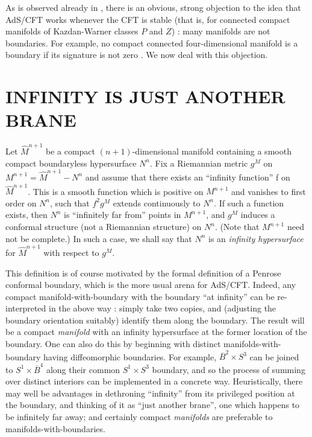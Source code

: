 \documentclass[a4paper,12pt]{article}
\theoremstyle{definition}
\renewcommand{\u}{\textit}
\renewcommand{\-}{$\dfrac{\quad\enspace}{\quad}$}
\begin{document}
As is observed already in \cite{3}, there is an obvious, strong objection to the idea that AdS/CFT works whenever the CFT is stable (that is, for connected compact manifolds of Kazdan-Warner classes $P$ and $Z$) : many manifolds are not boundaries. For example, no compact connected four-dimensional manifold is a boundary if its signature is not zero \cite{17}. We now deal with this objection.

\section{\large INFINITY IS JUST ANOTHER BRANE}

Let $\hat{M}^{n+1}$ be a compact $(n+1)$-dimensional manifold containing a smooth compact boundaryless hypersurface $N^n$. Fix a Riemannian metric $g^M$ on $M^{n+1}=\hat{M}^{n+1}-N^n$ and assume that there exists an ``infinity function'' f on $\hat{M}^{n+1}$. This is a smooth function which is positive on $M^{n+1}$ and vanishes to first order on $N^n$, such that $f^2g^M$ extends continuously to $N^n$. If such a function exists, then $N^n$ is ``infinitely far from'' points in $M^{n+1}$, and $g^M$ induces a conformal structure (not a Riemannian structure) on $N^n$. (Note that $M^{n+1}$ need not be complete.) In such a case, we shall say that $N^n$ is an \u{infinity hypersurface} for $\hat{M}^{n+1}$ with respect to $g^M$.

This definition is of course motivated by the formal definition \cite{15} of a Penrose conformal boundary, which is the more usual arena for AdS/CFT. Indeed, any compact manifold-with-boundary with the boundary ``at infinity'' can be re-interpreted in the above way : simply take two copies, and (adjusting the boundary orientation suitably) identify them along the boundary. The result will be a compact \u{manifold} with an infinity hypersurface at the former location of the boundary. One can also do this by beginning with distinct manifolds-with-boundary having diffeomorphic boundaries. For example, $\overline{B}^2\times S^3$ can be joined to $S^1\times \overline{B}^4$ along their common $S^1\times S^3$ boundary, and so the process of summing over distinct interiors \cite{3} can be implemented in a concrete way. Heuristically, there may well be advantages in dethroning ``infinity'' from its privileged position at the boundary, and thinking of it as ``just another brane'', one which happens to be infinitely far away; and certainly compact \u{manifolds} are preferable to manifolds-with-boundaries.
\end{document}
